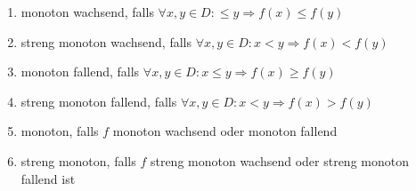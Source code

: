 \documentclass[10pt,landscape]{article}
\begin{document}
\begin{multicols}{3}
\begin{enumerate}
        \item monoton wachsend, falls $\forall x, y \in D: \leq y \Longrightarrow f(x) \leq f(y)$ 
        \item streng monoton wachsend, falls $\forall x, y \in D: x<y \Longrightarrow f(x)<f(y)$
        \item monoton fallend, falls $\forall x, y \in D : x \leq y \Longrightarrow f(x) \geq f(y)$
        \item streng monoton fallend, falls $\forall x, y \in D : x<y \Longrightarrow f(x)>f(y)$
        \item monoton, falls $f$ monoton wachsend oder monoton fallend
        \item streng monoton, falls $f$ streng monoton wachsend oder streng monoton fallend ist
\end{enumerate}


\end{multicols}
\end{document}
